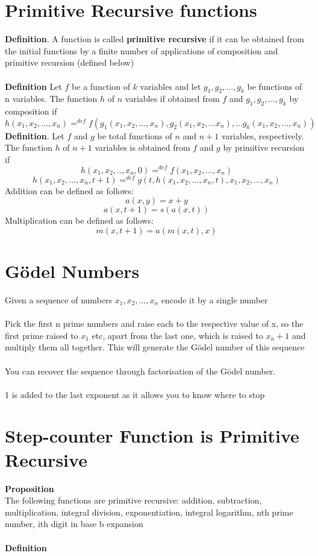 \documentclass{article}[18pt]
\begin{document}
\section{Primitive Recursive functions}
\textbf{Definition}. A function is called \textbf{primitive recursive} if it can be obtained from the initial functions by a finite number of applications of composition and primitive recursion (defined below)\\
\\
\textbf{Definition} Let $f$ be a function of $k$ variables and let $g_1,g_2,...,g_k$ be functions of n variables. The function $h$ of $n$ variables if obtained from $f$ and $g_1,g_2,...,g_k$ by composition if
$$h(x_1,x_2,...,x_n)=^{def}f(g_1(x_1,x_2,...,x_n), g_2(x_1,x_2,...x_n),... g_k(x_1,x_2,...,x_n))$$
\textbf{Definition}. Let $f$ and $g$ be total functions of $n$ and $n+1$ variables, respectively. The function $h$ of $n+1$ variables is obtained from $f$ and $g$ by primitive recursion if
$$h(x_1,x_2,..,x_n,0)=^{def} f(x_1,x_2,...,x_n)$$
$$h(x_1,x_2,...,x_n,t+1)=^{def} g(t,h(x_1,x_2,...,x_n,t),x_1,x_2,...,x_n)$$
Addition can be defined as follows:
$$a(x,y)=x+y$$
$$a(x,t+1)=s(a(x,t))$$
Multiplication can be defined as follows:
$$m(x,t+1)=a(m(x,t),x)$$
\section{Gödel Numbers}
Given a sequence of numbers $x_1,x_2,...,x_n$ encode it by a single number\\
\\
Pick the first n prime numbers and raise each to the respective value of x, so the first prime raised to $x_1$ etc, apart from the last one, which is raised to $x_n+1$ and multiply them all together. This will generate the Gödel number of this sequence\\
\\
You can recover the sequence through factorisation of the Gödel number.\\
\\
1 is added to the last exponent as it allows you to know where to stop

\section{Step-counter Function is Primitive Recursive}
\textbf{Proposition}\\
The following functions are primitive recursive: addition, subtraction, multiplication, integral division, exponentiation, integral logarithm, nth prime number, ith digit in base b expansion\\
\\
\textbf{Definition}
\end{document}

